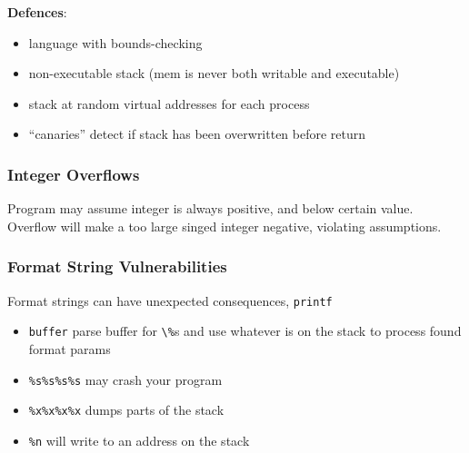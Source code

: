 \documentclass[]{article}
\theoremstyle{definition}
\begin{document}
	\textbf{Defences}:
	\begin{itemize}
		\item language with bounds-checking
		\item non-executable stack (mem is never both writable and executable)
		\item stack at random virtual addresses for each process
		\item ``canaries'' detect if stack has been overwritten before return
	\end{itemize}

	\subsubsection{Integer Overflows}
	Program may assume integer is always positive, and below certain value. Overflow will make a too large singed integer negative, violating assumptions.

	\subsubsection{Format String Vulnerabilities}
	Format strings can have unexpected consequences, \lstinline|printf|
	\begin{itemize}
		\item \texttt{buffer} parse buffer for \lstinline|\%|s and use whatever is on the stack to process found format params
		\item \texttt{\%s\%s\%s\%s} may crash your program
		\item \texttt{\%x\%x\%x\%x} dumps parts of the stack
		\item \texttt{\%n} will write to an address on the stack
	\end{itemize}
\end{document}
